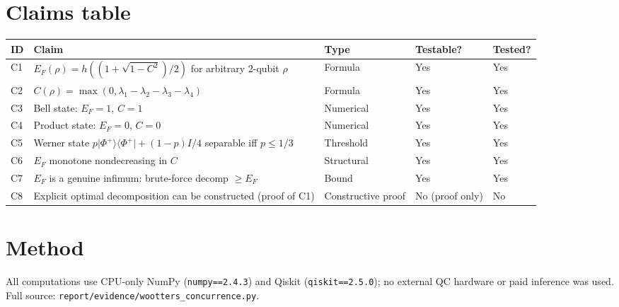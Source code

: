 \documentclass[11pt]{article}
\begin{document}
\section{Claims table}
\begin{tabular}{@{}p{0.4cm}p{7cm}p{2cm}p{2cm}p{2cm}@{}}
\toprule
ID & Claim & Type & Testable? & Tested? \\ \midrule
C1 & $E_F(\rho) = h((1+\sqrt{1-C^2})/2)$ for arbitrary 2-qubit $\rho$ & Formula & Yes & Yes \\
C2 & $C(\rho) = \max(0, \lambda_1-\lambda_2-\lambda_3-\lambda_4)$ & Formula & Yes & Yes \\
C3 & Bell state: $E_F = 1$, $C = 1$ & Numerical & Yes & Yes \\
C4 & Product state: $E_F = 0$, $C = 0$ & Numerical & Yes & Yes \\
C5 & Werner state $p\bigl|\Phi^+\bigr\rangle\!\bigl\langle\Phi^+\bigr| + (1-p)I/4$ separable iff $p \le 1/3$ & Threshold & Yes & Yes \\
C6 & $E_F$ monotone nondecreasing in $C$ & Structural & Yes & Yes \\
C7 & $E_F$ is a genuine infimum: brute-force decomp $\ge E_F$ & Bound & Yes & Yes \\
C8 & Explicit optimal decomposition can be constructed (proof of C1) & Constructive proof & No (proof only) & No \\
\bottomrule
\end{tabular}

\section{Method}
All computations use CPU-only NumPy (\texttt{numpy==2.4.3}) and
Qiskit (\texttt{qiskit==2.5.0}); no external QC hardware or paid
inference was used. Full source: \texttt{report/evidence/wootters\_concurrence.py}.
\end{document}
